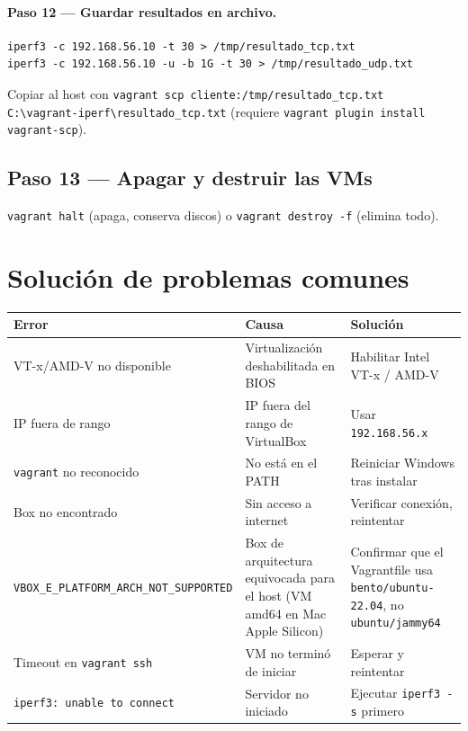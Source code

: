 \documentclass[12pt]{article}
\begin{document}
\paragraph{Paso 12 --- Guardar resultados en archivo.}

\begin{verbatim}
iperf3 -c 192.168.56.10 -t 30 > /tmp/resultado_tcp.txt
iperf3 -c 192.168.56.10 -u -b 1G -t 30 > /tmp/resultado_udp.txt
\end{verbatim}

Copiar al host con \texttt{vagrant scp cliente:/tmp/resultado\_tcp.txt C:\textbackslash vagrant-iperf\textbackslash resultado\_tcp.txt} (requiere \texttt{vagrant plugin install vagrant-scp}).

\subsection{Paso 13 --- Apagar y destruir las VMs}

\texttt{vagrant halt} (apaga, conserva discos) o \texttt{vagrant destroy -f} (elimina todo).

\section{Solución de problemas comunes}

\begin{center}
\begin{tabular}{|l|l|l|}
\hline
\textbf{Error} & \textbf{Causa} & \textbf{Solución} \\
\hline
VT-x/AMD-V no disponible & Virtualización deshabilitada en BIOS & Habilitar Intel VT-x / AMD-V \\
\hline
IP fuera de rango & IP fuera del rango de VirtualBox & Usar \texttt{192.168.56.x} \\
\hline
\texttt{vagrant} no reconocido & No está en el PATH & Reiniciar Windows tras instalar \\
\hline
Box no encontrado & Sin acceso a internet & Verificar conexión, reintentar \\
\hline
\texttt{VBOX\_E\_PLATFORM\_ARCH\_NOT\_SUPPORTED} & Box de arquitectura equivocada para el host (VM amd64 en Mac Apple Silicon) & Confirmar que el Vagrantfile usa \texttt{bento/ubuntu-22.04}, no \texttt{ubuntu/jammy64} \\
\hline
Timeout en \texttt{vagrant ssh} & VM no terminó de iniciar & Esperar y reintentar \\
\hline
\texttt{iperf3: unable to connect} & Servidor no iniciado & Ejecutar \texttt{iperf3 -s} primero \\
\hline
\end{tabular}
\end{center}
\end{document}
